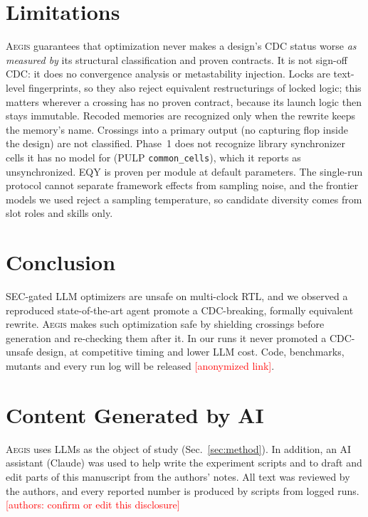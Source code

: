 \documentclass[conference,10pt]{IEEEtran}
\newcommand{\aegis}{\textsc{Aegis}}
\newcommand{\pend}[1]{\textcolor{red}{[#1]}}
\begin{document}
\section{Limitations}
\label{sec:limits}

\aegis{} guarantees that optimization never makes a design's CDC status worse \emph{as measured by} its
structural classification and proven contracts. It is not sign-off CDC: it does no convergence analysis or
metastability injection. Locks are text-level fingerprints, so they also reject equivalent restructurings of locked
logic; this matters wherever a crossing has no proven contract, because its launch logic then stays immutable.
Recoded memories are recognized only when the rewrite keeps the memory's name. Crossings into a primary output
(no capturing flop inside the design) are not classified. Phase~1 does not recognize
library synchronizer cells it has no model for (PULP \texttt{common\_cells}), which it reports as unsynchronized. EQY is proven per module at default parameters. The single-run protocol cannot separate
framework effects from sampling noise, and the frontier models we used reject a sampling temperature, so candidate
diversity comes from slot roles and skills only.

\section{Conclusion}

SEC-gated LLM optimizers are unsafe on multi-clock RTL, and we observed a reproduced state-of-the-art agent promote
a CDC-breaking, formally equivalent rewrite. \aegis{} makes such optimization safe by shielding crossings before
generation and re-checking them after it. In our runs it never promoted a CDC-unsafe design, at competitive timing
and lower LLM cost. Code, benchmarks, mutants and every run log will be released \pend{anonymized link}.

\section*{Content Generated by AI}
\aegis{} uses LLMs as the object of study (Sec.~\ref{sec:method}). In addition, an AI assistant (Claude) was used
to help write the experiment scripts and to draft and edit parts of this manuscript from the authors' notes. All
text was reviewed by the authors, and every reported number is produced by scripts from logged runs.
\pend{authors: confirm or edit this disclosure}



\end{document}
